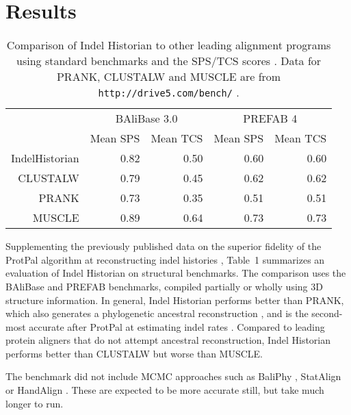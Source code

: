 \documentclass{bioinfo}
\begin{document}
\section{Results}

\begin{table}
  \begin{tabular}{r|rr|rr}
    & \multicolumn{2}{c|}{BAliBase 3.0} & \multicolumn{2}{c}{PREFAB 4} \\
    & Mean SPS & Mean TCS & Mean SPS & Mean TCS \\
    \hline
IndelHistorian & 0.82 & 0.50 & 0.60 & 0.60 \\
CLUSTALW & 0.79 & 0.45 & 0.62 & 0.62 \\
PRANK & 0.73 & 0.35 & 0.51 & 0.51 \\
MUSCLE & 0.89 & 0.64 & 0.73 & 0.73 \\
  \end{tabular}
  \caption{
    Comparison of Indel Historian to other leading alignment programs using standard benchmarks
    and the SPS/TCS scores \citep{ThompsonEtAl2005}.
    Data for PRANK, CLUSTALW and MUSCLE are from {\tt http://drive5.com/bench/} \citep{Edgar2010}.
  }
\end{table}

Supplementing the previously published data on the superior fidelity of the ProtPal algorithm
at reconstructing indel histories \citep{Westesson2012-zg},
Table~1 summarizes an evaluation of Indel Historian
on structural benchmarks.
The comparison uses the BAliBase and PREFAB
benchmarks, compiled partially or wholly using 3D structure information.
In general, Indel Historian performs better than PRANK,
which also generates a phylogenetic ancestral reconstruction \citep{LoytynojaGoldman2008},
and is the second-most accurate after ProtPal at estimating indel rates \citep{Westesson2012-zg}.
Compared to leading protein aligners that do not attempt ancestral reconstruction, Indel Historian performs better than CLUSTALW but worse than MUSCLE.

The benchmark did not include MCMC approaches
such as BaliPhy \citep{Redelings2014}, StatAlign \citep{NovakEtAl2008} or HandAlign \citep{WestessonBarquistHolmes2012}.
These are expected to be more accurate still, but take much longer to run.

% 
% 
% 
\end{document}
